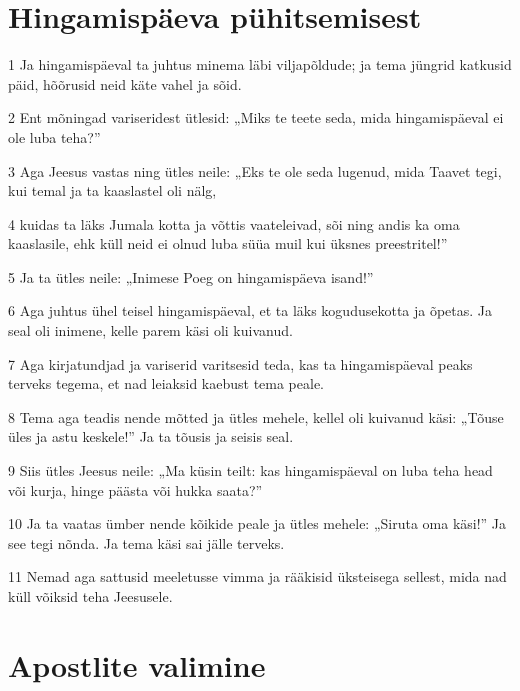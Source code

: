 \section*{Hingamispäeva pühitsemisest}

\par 1 Ja hingamispäeval ta juhtus minema läbi viljapõldude; ja tema jüngrid katkusid päid, hõõrusid neid käte vahel ja sõid.
\par 2 Ent mõningad variseridest ütlesid: „Miks te teete seda, mida hingamispäeval ei ole luba teha?”
\par 3 Aga Jeesus vastas ning ütles neile: „Eks te ole seda lugenud, mida Taavet tegi, kui temal ja ta kaaslastel oli nälg,
\par 4 kuidas ta läks Jumala kotta ja võttis vaateleivad, sõi ning andis ka oma kaaslasile, ehk küll neid ei olnud luba süüa muil kui üksnes preestritel!”
\par 5 Ja ta ütles neile: „Inimese Poeg on hingamispäeva isand!”
\par 6 Aga juhtus ühel teisel hingamispäeval, et ta läks kogudusekotta ja õpetas. Ja seal oli inimene, kelle parem käsi oli kuivanud.
\par 7 Aga kirjatundjad ja variserid varitsesid teda, kas ta hingamispäeval peaks terveks tegema, et nad leiaksid kaebust tema peale.
\par 8 Tema aga teadis nende mõtted ja ütles mehele, kellel oli kuivanud käsi: „Tõuse üles ja astu keskele!” Ja ta tõusis ja seisis seal.
\par 9 Siis ütles Jeesus neile: „Ma küsin teilt: kas hingamispäeval on luba teha head või kurja, hinge päästa või hukka saata?”
\par 10 Ja ta vaatas ümber nende kõikide peale ja ütles mehele: „Siruta oma käsi!” Ja see tegi nõnda. Ja tema käsi sai jälle terveks.
\par 11 Nemad aga sattusid meeletusse vimma ja rääkisid üksteisega sellest, mida nad küll võiksid teha Jeesusele.

\section*{Apostlite valimine}

